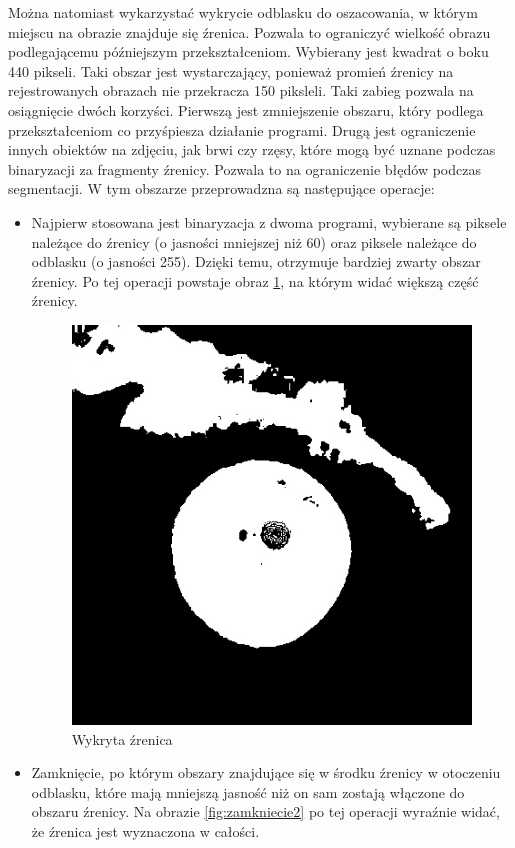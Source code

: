 Można natomiast wykarzystać wykrycie odblasku do oszacowania, w którym miejscu na obrazie znajduje się źrenica. Pozwala to ograniczyć wielkość obrazu podlegającemu późniejszym przekształceniom. Wybierany jest kwadrat o boku 440 pikseli. Taki obszar jest wystarczający, ponieważ promień źrenicy na rejestrowanych obrazach nie przekracza 150 piksleli. Taki zabieg pozwala na osiągnięcie dwóch korzyści. Pierwszą jest zmniejszenie obszaru, który podlega przekształceniom co przyśpiesza działanie programi. Drugą jest ograniczenie innych obiektów na zdjęciu, jak brwi czy rzęsy, które mogą być uznane podczas binaryzacji za fragmenty źrenicy. Pozwala to na ograniczenie błędów podczas segmentacji. W tym obszarze przeprowadzna są następujące operacje:
\begin{itemize}
\item Najpierw stosowana jest binaryzacja z dwoma programi, wybierane są piksele należące do źrenicy (o jasności mniejszej niż 60) oraz piksele należące do odblasku (o jasności 255). Dzięki temu, otrzymuje bardziej zwarty obszar źrenicy. Po tej operacji powstaje obraz \ref{fig:binaryzacja2}, na którym widać większą część źrenicy.
\begin{figure}
\begin{center}
\includegraphics[scale=0.5]{binaryzacja2.jpg}
\caption{Wykryta źrenica}
\label{fig:binaryzacja2}
\end{center}
\end{figure}
\item Zamknięcie, po którym obszary znajdujące się w środku źrenicy w otoczeniu odblasku, które mają mniejszą jasność niż on sam zostają włączone do obszaru źrenicy. Na obrazie \ref{fig:zamkniecie2} po tej operacji wyraźnie widać, że źrenica jest wyznaczona w całości.

\end{itemize}
